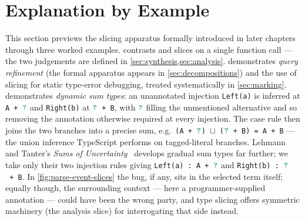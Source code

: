 \section{Explanation by Example}
\label{sec:explanation}

This section previews the slicing apparatus formally introduced in later chapters through three worked examples.  contrasts  and  slices on a single function call --- the two judgements are defined in \cref{sec:synthesis,sec:analysis}.  demonstrates \emph{query refinement} (the formal apparatus appears in \cref{sec:decompositions}) and the use of slicing for static type-error debugging, treated systematically in \cref{sec:marking}.  demonstrates \emph{dynamic sum types}: an unannotated injection \texttt{Left(a)} is inferred at \texttt{A~+~${\color{teal}\texttt{?}}$} and \texttt{Right(b)} at \texttt{${\color{teal}\texttt{?}}$~+~B}, with ${\color{teal}\texttt{?}}$ filling the unmentioned alternative and so removing the annotation otherwise required at every injection. The case rule then joins the two branches into a precise sum, e.g.\ \texttt{(A~+~${\color{teal}\texttt{?}}$)~$\sqcup$~(${\color{teal}\texttt{?}}$~+~B)~=~A~+~B} --- the union inference TypeScript performs on tagged-literal branches. Lehmann and Tanter's \emph{Sums of Uncertainty}~\cite{SumsOfUncertainty} develops gradual sum types far further; we take only their two injection rules giving \texttt{Left(a)~:~A~+~${\color{teal}\texttt{?}}$} and \texttt{Right(b)~:~${\color{teal}\texttt{?}}$~+~B}. In \cref{fig:parse-event-slices} the bug, if any, sits in the selected term itself; equally though, the surrounding context --- here a programmer-supplied annotation --- could have been the wrong party, and type slicing offers symmetric machinery (the analysis slice) for interrogating that side instead.

